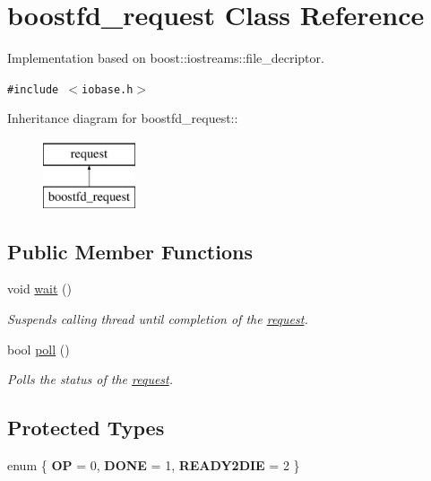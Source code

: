 \hypertarget{classboostfd__request}{
\section{boostfd\_\-request Class Reference}
\label{classboostfd__request}
}
Implementation based on boost::iostreams::file\_\-decriptor.  


{\tt \#include $<$iobase.h$>$}

Inheritance diagram for boostfd\_\-request::\begin{figure}[H]
\begin{center}
\leavevmode
\includegraphics[height=2cm]{classboostfd__request}
\end{center}
\end{figure}
\subsection*{Public Member Functions}
\begin{CompactItemize}
\item 
\hypertarget{group__iolayer_g6e561d1080c80655590c5685f746174f}{
void \hyperlink{group__iolayer_g6e561d1080c80655590c5685f746174f}{wait} ()}
\label{group__iolayer_g6e561d1080c80655590c5685f746174f}

\begin{CompactList}\small\item\em Suspends calling thread until completion of the \hyperlink{classrequest}{request}. \item\end{CompactList}\item 
bool \hyperlink{group__iolayer_g3ec494e77ffa0621380e54cdc4cda657}{poll} ()
\begin{CompactList}\small\item\em Polls the status of the \hyperlink{classrequest}{request}. \item\end{CompactList}\end{CompactItemize}
\subsection*{Protected Types}
\begin{CompactItemize}
\item 
enum \{ \textbf{OP} =  0, 
\textbf{DONE} =  1, 
\textbf{READY2DIE} =  2
 \}
\end{CompactItemize}
